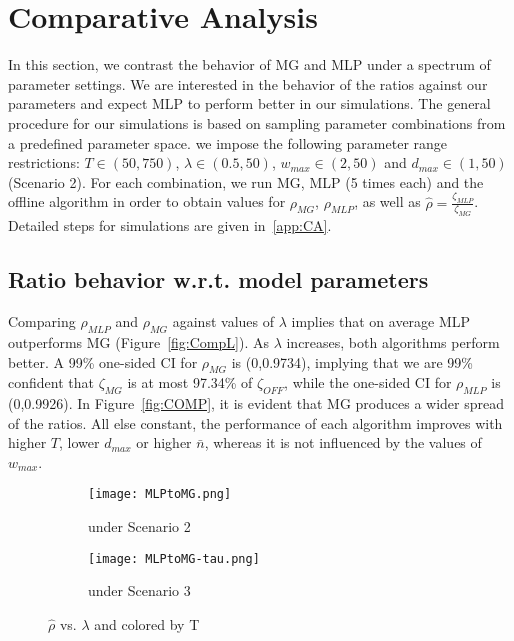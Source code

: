 \documentclass[oribibl]{llncs}
\begin{document}
\vspace{-30pt}
\section{Comparative Analysis}
\label{sec:CA}
\vspace{-8pt}
In this section, we contrast the behavior of MG and MLP under a
spectrum of parameter settings. We are interested in the behavior of
the ratios against our parameters and expect MLP to perform better in
our simulations. The general procedure for our simulations is based on
sampling parameter combinations from a predefined parameter space. 
we impose the following parameter range restrictions: $T \in
(50,750)$, $\lambda \in (0.5,50)$, $w_{max} \in (2,50)$ and $d_{max}
\in (1,50)$ (Scenario 2). For
each combination, we run MG, MLP (5 times each) and the offline
algorithm in order to obtain values for $\rho_{MG}$, $\rho_{MLP}$, as
well as $\hat{\rho}=\frac{\zeta_{MLP}}{ \zeta_{MG}}$. Detailed steps
for simulations are given in~\ref{app:CA}. 

\subsection {Ratio behavior w.r.t. model parameters}
Comparing $\rho_{MLP}$ and $\rho_{MG}$ against values of $\lambda$ implies that on average MLP outperforms MG (Figure~\ref{fig:CompL}). As $\lambda$ increases, both algorithms perform better. A 99\% one-sided CI for $\rho_{MG}$ is (0,0.9734), implying that we are 99\% confident that $\zeta_{MG}$ is at most 97.34\% of $\zeta_{OFF}$, while the one-sided CI for $\rho_{MLP}$ is (0,0.9926). In Figure~\ref{fig:COMP}, it is evident that MG produces a wider spread of the ratios. All else constant, the performance of each algorithm improves with higher $T$, lower $d_{max}$ or higher $\bar{n}$, whereas it is not influenced by the values of $w_{max}$. 

\begin{figure}[ht]\centering 
\vspace{-13pt}
\begin{subfigure}{.48\textwidth}
  \centering
\texttt{[image: MLPtoMG.png]}
\caption{under Scenario 2}
\label{fig:MLPtoMG}
\end{subfigure}
\hfill
\begin{subfigure}{.48\textwidth}
  \centering
\texttt{[image: MLPtoMG-tau.png]}
\caption{under Scenario 3}
\label{fig:MLPtoMGtau}
\end{subfigure}
\caption{$\hat{\rho}$ vs. $\lambda$ and colored by T}
\end{figure}
\end{document}
